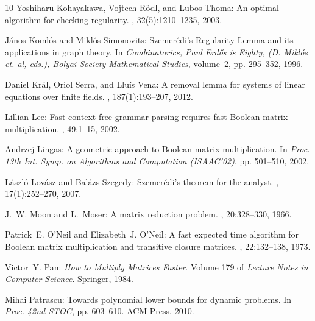 \begin{thebibliography}{10}
{\sc Yoshiharu Kohayakawa, Vojtech R{\"o}dl, and Lubos Thoma}: An optimal
  algorithm for checking regularity.
, 32(5):1210--1235, 2003.
\newblock [\epfmtdoi{10.1137/S0097539702408223}]

{\sc J\'{a}nos Koml\'{o}s and Mikl\'{o}s Simonovits}: {S}zemer\'{e}di's
  {R}egularity {L}emma and its applications in graph theory.
\newblock In {\em Combinatorics, Paul Erd{\H o}s is Eighty, (D. Mikl{\'o}s et.
  al, eds.), Bolyai Society Mathematical Studies}, volume~2, pp. 295--352,
  1996.

{\sc Daniel Kr\'{a}l, Oriol Serra, and Llu\'{i}s Vena}: A removal lemma for
  systems of linear equations over finite fields.
, 187(1):193--207, 2012.
\newblock [\epfmtdoi{10.1007/s11856-011-0080-y}]

{\sc Lillian Lee}: Fast context-free grammar parsing requires fast {B}oolean
  matrix multiplication.
, 49:1--15, 2002.
\newblock [\epfmtdoi{10.1145/505241.505242}]

{\sc Andrzej Lingas}: A geometric approach to {B}oolean matrix multiplication.
\newblock In {\em Proc. 13th Int. Symp. on Algorithms and Computation
  (ISAAC'02)}, pp. 501--510, 2002.
\newblock [\epfmtdoi{10.1007/3-540-36136-7\_44}]

{\sc L\'{a}szl\'{o} Lov{\'a}sz and Bal\'{a}zs Szegedy}: {S}zemer\'{e}di's
  theorem for the analyst.
, 17(1):252--270, 2007.
\newblock [\epfmtdoi{10.1007/s00039-007-0599-6}]

{\sc J.~W. Moon and L.~Moser}: A matrix reduction problem.
, 20:328--330, 1966.
\newblock [\epfmtdoi{10.1090/S0025-5718-66-99935-2}]

{\sc Patrick~E. O'Neil and Elizabeth~J. O'Neil}: A fast expected time algorithm
  for {B}oolean matrix multiplication and transitive closure matrices.
, 22:132--138, 1973.
\newblock [\epfmtdoi{10.1016/S0019-9958(73)90228-3}]

{\sc Victor~Y. Pan}: {\em How to Multiply Matrices Faster}.
\newblock Volume 179 of {\em Lecture Notes in Computer Science}.
\newblock Springer, 1984.

{\sc Mihai Patrascu}: Towards polynomial lower bounds for dynamic problems.
\newblock In {\em Proc. 42nd STOC}, pp. 603--610. ACM Press, 2010.
\newblock [\epfmtdoi{10.1145/1806689.1806772}]


\end{thebibliography}
